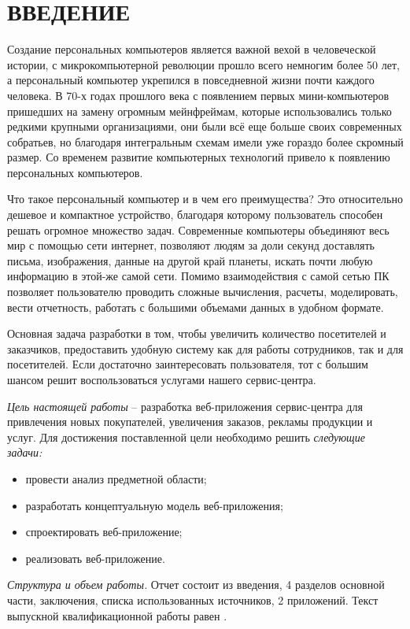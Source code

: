 \section*{ВВЕДЕНИЕ}

Создание персональных компьютеров является важной вехой в человеческой истории, с микрокомпьютерной революции прошло всего немногим более 50 лет, а персональный компьютер укрепился в повседневной жизни почти каждого человека. В 70-х годах прошлого века с появлением первых мини-компьютеров пришедших на замену огромным мейнфреймам, которые использовались только редкими крупными организациями, они были всё еще больше своих современных собратьев, но благодаря интегральным схемам имели уже гораздо более скромный размер. Со временем развитие компьютерных технологий привело к появлению персональных компьютеров.

Что такое персональный компьютер и в чем его преимущества? Это относительно дешевое и компактное устройство, благодаря которому пользователь способен решать огромное множество задач. Современные компьютеры объединяют весь мир с помощью сети интернет, позволяют людям за доли секунд доставлять письма, изображения, данные на другой край планеты, искать почти любую информацию в этой-же самой сети. Помимо взаимодействия с самой сетью ПК позволяет пользователю проводить сложные вычисления, расчеты, моделировать, вести отчетность, работать с большими объемами данных в удобном формате.

Основная задача разработки в том, чтобы увеличить количество посетителей и заказчиков, предоставить удобную систему как для работы сотрудников, так и для посетителей. Если достаточно заинтересовать пользователя, тот с большим шансом решит воспользоваться услугами нашего сервис-центра.

\emph{Цель настоящей работы} – разработка веб-приложения сервис-центра для привлечения новых покупателей, увеличения заказов, рекламы продукции и услуг. Для достижения поставленной цели необходимо решить \emph{следующие задачи:}
\begin{itemize}
\item провести анализ предметной области;
\item разработать концептуальную модель веб-приложения;
\item спроектировать веб-приложение;
\item реализовать веб-приложение.
\end{itemize}

\emph{Структура и объем работы.} Отчет состоит из введения, 4 разделов основной части, заключения, списка использованных источников, 2 приложений. Текст выпускной квалификационной работы равен .

